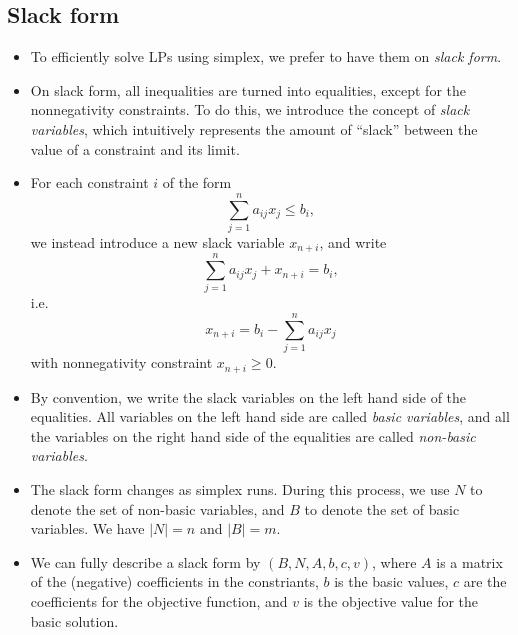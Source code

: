 \subsection{Slack form}
\begin{itemize}
\item To efficiently solve LPs using simplex, we prefer to have them
  on \emph{slack form}.
\item On slack form, all inequalities are turned into equalities,
  except for the nonnegativity constraints. To do this, we introduce
  the concept of \emph{slack variables}, which intuitively represents
  the amount of ``slack'' between the value of a constraint and its
  limit.
\item For each constraint $i$ of the form
$$
  \sum_{j=1}^n a_{ij} x_j \leq b_i,
$$
we instead introduce a new slack variable $x_{n+i}$, and write
$$
  \sum_{j=1}^n a_{ij} x_j + x_{n+i} = b_i,
$$
i.e.
$$
  x_{n+i} = b_i - \sum_{j=1}^n a_{ij} x_j
$$
with nonnegativity constraint $x_{n+i} \geq 0$.

\item By convention, we write the slack variables on the left hand
  side of the equalities. All variables on the left hand side are
  called \emph{basic variables}, and all the variables on the right
  hand side of the equalities are called \emph{non-basic variables}.

\item The slack form changes as simplex runs. During this process, we
  use $N$ to denote the set of non-basic variables, and $B$ to denote
  the set of basic variables. We have $|N| = n$ and $|B| = m$.

\item We can fully describe a slack form by $(B,N,A,b,c,v)$, where $A$
  is a matrix of the (negative) coefficients in the constriants, $b$
  is the basic values, $c$ are the coefficients for the objective
  function, and $v$ is the objective value for the basic solution.
\end{itemize}

